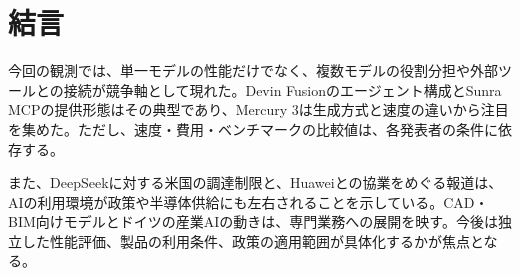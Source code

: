 \section*{結言}
今回の観測では、単一モデルの性能だけでなく、複数モデルの役割分担や外部ツールとの接続が競争軸として現れた。Devin Fusionのエージェント構成とSunra MCPの提供形態はその典型であり、Mercury 3は生成方式と速度の違いから注目を集めた。ただし、速度・費用・ベンチマークの比較値は、各発表者の条件に依存する。

また、DeepSeekに対する米国の調達制限と、Huaweiとの協業をめぐる報道は、AIの利用環境が政策や半導体供給にも左右されることを示している。CAD・BIM向けモデルとドイツの産業AIの動きは、専門業務への展開を映す。今後は独立した性能評価、製品の利用条件、政策の適用範囲が具体化するかが焦点となる。
